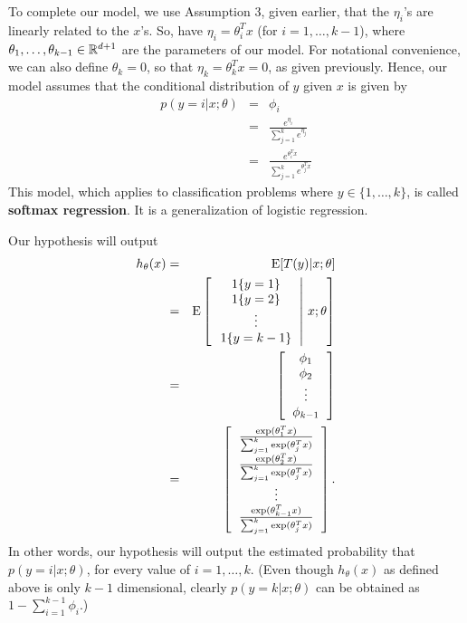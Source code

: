 \documentclass{article}
\begin{document}
To complete our model, we use Assumption 3, given earlier, that
the $\eta_i$'s are linearly related to the $x$'s.  So,
have $\eta_i = \theta_i^T x$ (for $i=1,\ldots, k-1$),
where $\theta_1, \ldots, \theta_{k-1} \in {\mathbb R}^{{d}+1}$ are the parameters of
our model.  For notational convenience, we can also define $\theta_k=0$, so
that $\eta_k=\theta_k^Tx = 0$, as given previously.  Hence, our model assumes
that the conditional distribution of $y$ given $x$ is given by
\begin{eqnarray}
p(y=i|x;\theta)
&=& \phi_i  \nonumber \\
&=& \frac{e^{\eta_i}}{\sum_{j=1}^k e^{\eta_j}} \nonumber \\
&=& \frac{e^{\theta_i^Tx}}{\sum_{j=1}^k e^{\theta_j^Tx}} \label{eqn-softmaxdef}
\end{eqnarray}
This model, which applies to classification problems
where $y \in \{1, \ldots, k\}$, is called {\bf softmax regression}.
It is a generalization of logistic regression.

Our hypothesis will output
\begin{eqnarray*}
h_\theta(x) &=& \E[T(y)|x;\theta] \\
&=& \E \left[ \left. \begin{tabular}{c} $1\{y=1\}$ \\ $1\{y=2\}$ \\ \vdots \\ $1\{y=k-1\}$ \end{tabular} \right|\, x;\theta \right] \\
&=& \left[ \begin{tabular}{c} $\phi_1$ \\ $\phi_2$ \\ \vdots \\ $\phi_{k-1}$ \end{tabular} \right] \\
&=& \left[ \begin{tabular}{c}
$\frac{\exp(\theta_1^Tx)}{\sum_{j=1}^k \exp(\theta_j^Tx)}$ \\
$\frac{\exp(\theta_2^Tx)}{\sum_{j=1}^k \exp(\theta_j^Tx)}$ \\
\vdots \\
$\frac{\exp(\theta_{k-1}^Tx)}{\sum_{j=1}^k \exp(\theta_j^Tx)}$
\end{tabular} \right].
\end{eqnarray*}
In other words, our hypothesis will output the estimated probability that $p(y=i|x;\theta)$, for every
value of $i=1,\ldots,k$.  (Even though $h_\theta(x)$ as defined above is only $k-1$ dimensional,
clearly $p(y=k|x;\theta)$ can be obtained as $1-\sum_{i=1}^{k-1} \phi_i$.)
\end{document}
